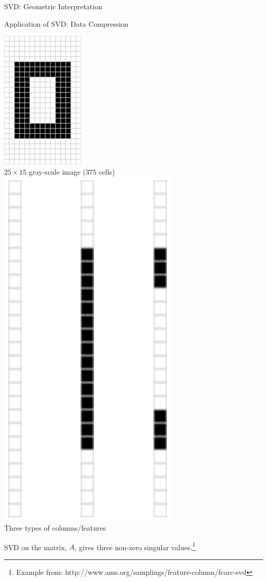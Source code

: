 \documentclass[compress,mathserif,t]{beamer} %
\begin{document}
\begin{frame}{SVD: Geometric Interpretation}


\end{frame}


\begin{frame}{Application of SVD: Data Compression}
	
	\begin{multicols}{2} 
		\includegraphics[width=.29\textwidth]{svd-O}
		\\ \vspace{-2mm}
		\small{$25 \times 15$ gray-scale 
		image ($375$ cells)} \vspace{-2mm}
		\columnbreak \\
		\includegraphics[width=.24\textwidth]{svd-O-features}
		\\ \vspace{-2mm}
		\small{Three types of 
		columns/features} 
		\vspace{-2mm}
	\end{multicols}
	SVD on the matrix, $A$, gives three 
	non-zero singular values.\footnote{		
	Example from: 
	http://www.ams.org/samplings/feature-column/fcarc-svd}
		    
\end{frame}
\end{document}
